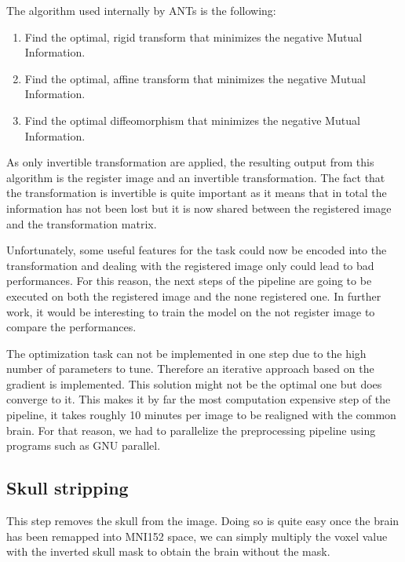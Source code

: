 The algorithm used internally by ANTs\footnotemark{} is the following:
\begin{enumerate}
\item Find the optimal, rigid transform that minimizes the negative Mutual Information.
\item Find the optimal, affine transform that minimizes the negative Mutual Information.
\item Find the optimal diffeomorphism that minimizes the negative Mutual Information.
\end{enumerate}
As only invertible transformation are applied, the resulting output from this algorithm is the register image and an invertible transformation. The fact that the transformation is invertible is quite important as it means that in total the information has not been lost but it is now shared between the registered image and the transformation matrix.

Unfortunately, some useful features for the task could now be encoded into the transformation and dealing with the registered image only could lead to bad performances. For this reason, the next steps of the pipeline are going to be executed on both the registered image and the none registered one. In further work, it would be interesting to train the model on the not register image to compare the performances.
 
The optimization task can not be implemented in one step due to the high number of parameters to tune. Therefore an iterative approach based on the gradient is implemented. This solution might not be the optimal one but does converge to it. This makes it by far the most computation expensive step of the pipeline, it takes roughly 10 minutes per image to be realigned with the common brain. For that reason, we had to parallelize the preprocessing pipeline using programs such as GNU parallel\footnotemark{}.

\subsection{Skull stripping}
This step removes the skull from the image. Doing so is quite easy once the brain has been remapped into MNI152 space, we can simply multiply the voxel value with the inverted skull mask to obtain the brain without the mask. 


